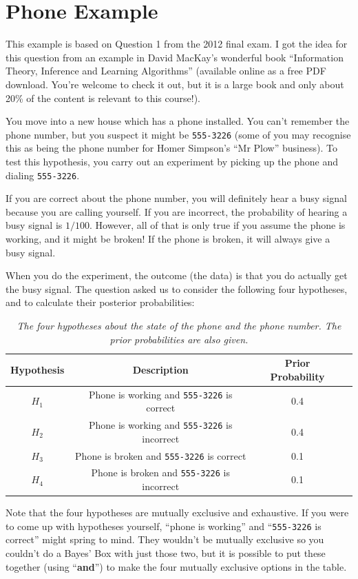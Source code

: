 \section{Phone Example}
This example is based on Question 1 from the 2012 final exam. I got the
idea for this question from an example in David MacKay's wonderful book
``Information Theory, Inference and Learning Algorithms''
(available online as a free PDF download. You're welcome to check it out, but
it is a large book and only about 20\% of the content is relevant to this course!).

You move into a new house which has a phone
installed. You can't remember the phone number, but you suspect it
might be {\tt 555-3226} (some of you may recognise
this as being the phone number for Homer Simpson's ``Mr Plow'' business).
To test this hypothesis, you carry out an experiment
by picking up the phone and dialing {\tt 555-3226}.

If you are correct about
the phone number, you will definitely hear a busy signal because you are calling
yourself.
If you are incorrect, the probability of hearing a busy signal is $1/100$.
However, all of that is only true if you assume the phone is working, and it
might be broken! If the phone is broken, it will always give a busy signal.

When you do the experiment, the outcome (the data) is that you do actually get the busy signal.
The question asked us to consider the following four hypotheses, and to calculate
their posterior probabilities:
\begin{table}[h!]
\begin{center}
\begin{tabular}{|c|c|c|c|}
\hline
Hypothesis & Description & Prior Probability\\
\hline
$H_1$ & Phone is working and {\tt 555-3226} is correct & 0.4\\
$H_2$ & Phone is working and {\tt 555-3226} is incorrect & 0.4\\
$H_3$ & Phone is broken and {\tt 555-3226} is correct & 0.1\\
$H_4$ & Phone is broken and {\tt 555-3226} is incorrect & 0.1\\
\hline
\end{tabular}
\caption{\it The four hypotheses about the state of the phone and the phone
number. The prior probabilities are also given.
\label{tab:phone}}
\end{center}
\end{table}
Note that the four hypotheses are mutually exclusive and exhaustive. If you were
to come up with hypotheses yourself, ``phone is working'' and ``{\tt 555-3226} is correct''
might spring to mind. They wouldn't be mutually exclusive so you couldn't do a
Bayes' Box with just those two, but it is possible to put these together (using
``{\bf and}'') to make the four mutually exclusive options in the table.

